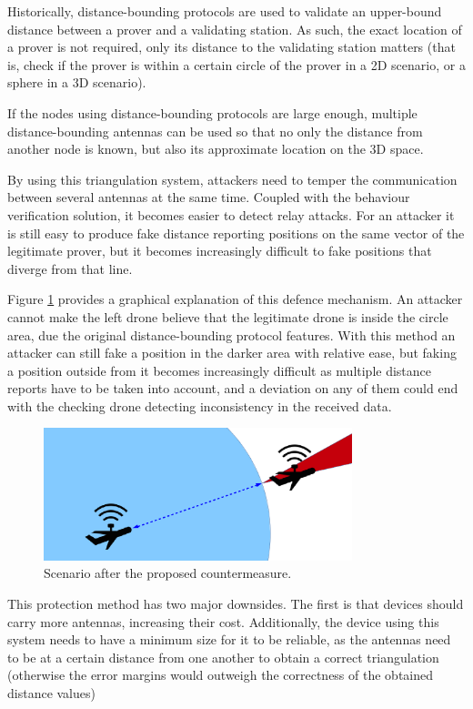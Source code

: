 \documentclass{article}
\begin{document}
Historically, distance-bounding protocols are used to validate an upper-bound distance between a prover and a validating station. As such, the exact location of a prover is not required, only its distance to the validating station matters (that is, check if the prover is within a certain circle of the prover in a 2D scenario, or a sphere in a 3D scenario).

If the nodes using distance-bounding protocols are large enough, multiple distance-bounding antennas can be used so that no only the distance from another node is known, but also its approximate location on the 3D space.

By using this triangulation system, attackers need to temper the communication between several antennas at the same time. Coupled with the behaviour verification solution, it becomes easier to detect relay attacks. For an attacker it is still easy to produce fake distance reporting positions on the same vector of the legitimate prover, but it becomes increasingly difficult to fake positions that diverge from that line. 

Figure \ref{fig:attackexample3} provides a graphical explanation of this defence mechanism. An attacker cannot make the left drone believe that the legitimate drone is inside the circle area, due the original distance-bounding protocol features. With this method an attacker can still fake a position in the darker area with relative ease, but faking a position outside from it becomes increasingly difficult as multiple distance reports have to be taken into account, and a deviation on any of them could end with the checking drone detecting inconsistency in the received data.

  \begin{figure}[h!]
  \centering
    \includegraphics[width=0.8\textwidth]{images/attack3.png}
  \caption{Scenario after the proposed countermeasure.}
  \label{fig:attackexample3}
\end{figure}

This protection method has two major downsides. The first is that devices should carry more antennas, increasing their cost. Additionally, the device using this system needs to have a minimum size for it to be reliable, as the antennas need to be at a certain distance from one another to obtain a correct triangulation (otherwise the error margins would outweigh the correctness of the obtained distance values)
\end{document}
